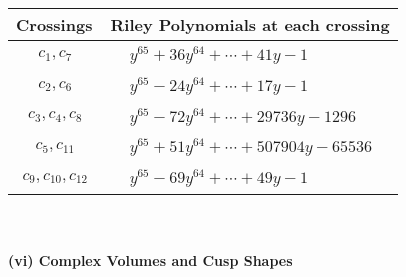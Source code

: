 \documentclass[1p]{elsarticle_modified}
\theoremstyle{definition}
\begin{document}
\begin{tabular}{m{50pt}|m{274pt}}
Crossings & \hspace{64pt}Riley Polynomials at each crossing \\
\hline $$\begin{aligned}c_{1},c_{7}\end{aligned}$$&$\begin{aligned}
&y^{65}+36 y^{64}+\cdots+41 y-1
\end{aligned}$\\
\hline $$\begin{aligned}c_{2},c_{6}\end{aligned}$$&$\begin{aligned}
&y^{65}-24 y^{64}+\cdots+17 y-1
\end{aligned}$\\
\hline $$\begin{aligned}c_{3},c_{4},c_{8}\end{aligned}$$&$\begin{aligned}
&y^{65}-72 y^{64}+\cdots+29736 y-1296
\end{aligned}$\\
\hline $$\begin{aligned}c_{5},c_{11}\end{aligned}$$&$\begin{aligned}
&y^{65}+51 y^{64}+\cdots+507904 y-65536
\end{aligned}$\\
\hline $$\begin{aligned}c_{9},c_{10},c_{12}\end{aligned}$$&$\begin{aligned}
&y^{65}-69 y^{64}+\cdots+49 y-1
\end{aligned}$\\
\hline
\end{tabular}\\~\\
\newpage\flushleft \textbf{(vi) Complex Volumes and Cusp Shapes}
\end{document}
